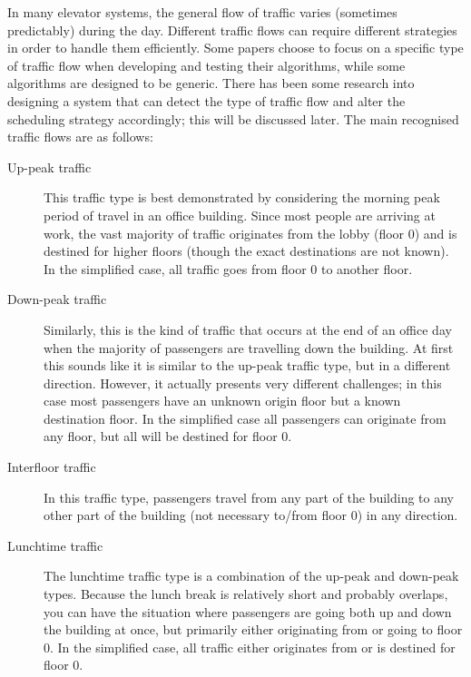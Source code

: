 \documentclass{UoYCSproject}
\begin{document}
In many elevator systems, the general flow of traffic varies (sometimes predictably) during the day.  Different traffic flows can require different strategies in order to handle them efficiently.  Some papers choose to focus on a specific type of traffic flow when developing and testing their algorithms, while some algorithms are designed to be generic.  There has been some research into designing a system that can detect the type of traffic flow and alter the scheduling strategy accordingly; this will be discussed later.  The main recognised traffic flows are as follows:  \citep{Nikovski2003, Brand2004, Rong2003, Smith2002, Collins1993Patent, Bao1994, Pepyne1997}

\begin{description}
	\item[Up-peak traffic] This traffic type is best demonstrated by considering the morning peak period of travel in an office building.  Since most people are arriving at work, the vast majority of traffic originates from the lobby (floor 0) and is destined for higher floors (though the exact destinations are not known).  In the simplified case, all traffic goes from floor 0 to another floor.  \citep{Bao1994, Brand2004, Smith2002, Pepyne1997}
	\item[Down-peak traffic] Similarly, this is the kind of traffic that occurs at the end of an office day when the majority of passengers are travelling down the building.  At first this sounds like it is similar to the up-peak traffic type, but in a different direction.  However, it actually presents very different challenges; in this case most passengers have an unknown origin floor but a known destination floor.  In the simplified case all passengers can originate from any floor, but all will be destined for floor 0.  \citep{Bao1994, Brand2004, Smith2002, Pepyne1997}
	\item[Interfloor traffic] In this traffic type, passengers travel from any part of the building to any other part of the building (not necessary to/from floor 0) in any direction.  \citep{Pepyne1997, Collins1993Patent}
	\item[Lunchtime traffic] The lunchtime traffic type is a combination of the up-peak and down-peak types.  Because the lunch break is relatively short and probably overlaps, you can have the situation where passengers are going both up and down the building at once, but primarily either originating from or going to floor 0.  In the simplified case, all traffic either originates from or is destined for floor 0.  \citep{Bao1994, Brand2004, Smith2002, Pepyne1997}
\end{description}
\end{document}

